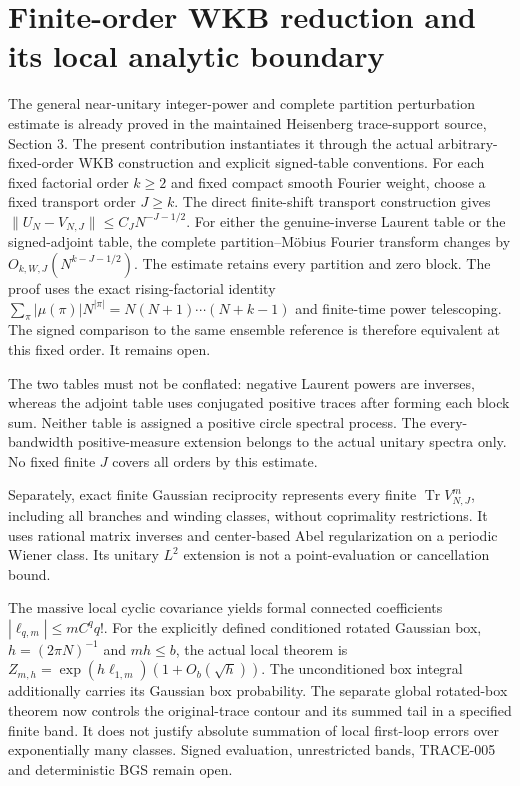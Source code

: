 \section{Finite-order WKB reduction and its local analytic boundary}
The general near-unitary integer-power and complete partition perturbation
estimate is already proved in the maintained Heisenberg trace-support source,
Section 3. The present contribution instantiates it through the actual
arbitrary-fixed-order WKB construction and explicit signed-table conventions.
For each fixed factorial order $k\geq2$ and fixed compact smooth Fourier
weight, choose a fixed transport order $J\geq k$. The direct finite-shift
transport construction gives $\|U_N-V_{N,J}\|\leq C_JN^{-J-1/2}$.
For either the genuine-inverse Laurent table or the signed-adjoint table,
the complete partition--M\"obius Fourier transform changes by
$O_{k,W,J}(N^{k-J-1/2})$. The estimate retains every partition and zero block.
The proof uses the exact rising-factorial identity
$\sum_\pi|\mu(\pi)|N^{|\pi|}=N(N+1)\cdots(N+k-1)$ and finite-time power
telescoping. The signed comparison to the same ensemble reference is
therefore equivalent at this fixed order. It remains open.

The two tables must not be conflated: negative Laurent powers are inverses,
whereas the adjoint table uses conjugated positive traces after forming each
block sum. Neither table is assigned a positive circle spectral process.
The every-bandwidth positive-measure extension belongs to the actual unitary
spectra only. No fixed finite $J$ covers all orders by this estimate.

Separately, exact finite Gaussian reciprocity represents every finite
$\operatorname{Tr}V_{N,J}^m$, including all branches and winding classes,
without coprimality restrictions. It uses rational matrix inverses and
center-based Abel regularization on a periodic Wiener class. Its unitary
$L^2$ extension is not a point-evaluation or cancellation bound.

The massive local cyclic covariance yields formal connected coefficients
$|\ell_{q,m}|\leq mC^q q!$. For the explicitly defined conditioned rotated
Gaussian box, $h=(2\pi N)^{-1}$ and $mh\leq b$, the actual local theorem is
$Z_{m,h}=\exp(h\ell_{1,m})(1+O_b(\sqrt h))$.
The unconditioned box integral additionally carries its Gaussian box
probability. The separate global rotated-box theorem now controls the
original-trace contour and its summed tail in a specified finite band.
It does not justify absolute summation of local first-loop errors over
exponentially many classes. Signed evaluation, unrestricted bands, TRACE-005
and deterministic BGS remain open.

